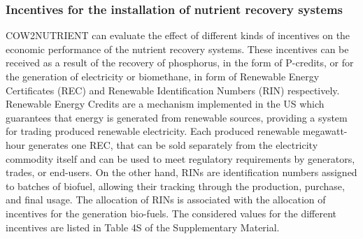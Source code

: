 \documentclass[authoryear]{elsarticle}
\begin{document}
%
%

\subsubsection{Incentives for the installation of nutrient recovery systems}
COW2NUTRIENT can evaluate the effect of different kinds of incentives on the economic performance of the nutrient recovery systems. These incentives can be received as a result of the recovery of phosphorus, in the form of P-credits, or for the generation of electricity or biomethane, in form of Renewable Energy Certificates (REC) and Renewable Identification Numbers (RIN) respectively. Renewable Energy Credits are a mechanism implemented in the US which guarantees that energy is generated from renewable sources, providing a system for trading produced renewable electricity. Each produced renewable megawatt-hour generates one REC, that can be sold separately from the electricity commodity itself and can be used to meet regulatory requirements by generators, trades, or end-users. On the other hand, RINs are identification numbers assigned to batches of biofuel, allowing their tracking through the production, purchase, and final usage. The allocation of RINs is associated with the allocation of incentives for the generation bio-fuels. 
The considered values for the different incentives are listed in Table 4S of the Supplementary Material.
\end{document}
